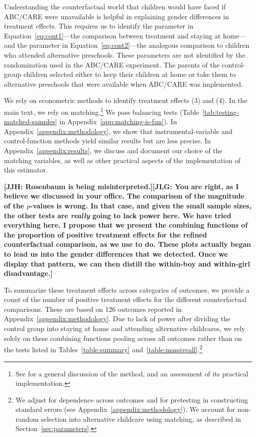 
Understanding the counterfactual world that children would have faced if ABC/CARE were unavailable is helpful in explaining gender differences in treatment effects. This requires us to identify the parameter in Equation~\eqref{eq:cont1}---the comparison between treatment and staying at home---and the parameter in Equation~\eqref{eq:cont2}---the analogous comparison to children who attended alternative preschools. These parameters are not identified by the randomization used in the ABC/CARE experiment. The parents of the control-group children selected either to keep their children at home or take them to alternative preschools that were available when ABC/CARE was implemented.

We rely on econometric methods to identify treatment effects (3) and (4). In the main text, we rely on matching.\footnote{See \citet{Heckman_Ichimura_etal_1998_REStud} for a general discussion of the method, and an assessment of its practical implementation.} We pass balancing tests (Table~\ref{tab:testing-matched-samples} in Appendix~\ref{app:matching-is-fun}). In Appendix~\ref{appendix:methodology}, we show that instrumental-variable and control-function methods yield similar results but are less precise. In Appendix~\ref{appendix:results}, we discuss and document our choice of the matching variables, as well as other practical aspects of the implementation of this estimator.

\textbf{[JJH: Rosenbaum is being misinterpreted.][JLG: You are right, as I believe we discussed in your office. The comparison of the magnitude of the $p$-values is wrong. In that case, and given the small sample sizes, the other tests are \textit{really} going to lack power here. We have tried everything here. I propose that we present the combining functions of the proportion of positive treatment effects for the refined counterfactual comparison, as we use to do. These plots actually began to lead us into the gender differences that we detected. Once we display that pattern, we can then distill the within-boy and within-girl disadvantage.]}

To summarize these treatment effects across categories of outcomes, we provide a count of the number of positive treatment effects for the different counterfactual comparisons. These are based on 126 outcomes reported in Appendix~\ref{appendix:methodology}. Due to lack of power after dividing the control group into staying at home and attending alternative childcares, we rely solely on these combining functions pooling across all outcomes rather than on the tests listed in Tables~\ref{table:summary} and~\ref{table:massiveall}.\footnote{We adjust for dependence across outcomes and for pretesting in constructing standard errors (see Appendix~\ref{appendix:methodology}). We account for non-random selection into alternative childcare using matching, as described in Section~\ref{sec:parameters}.}


